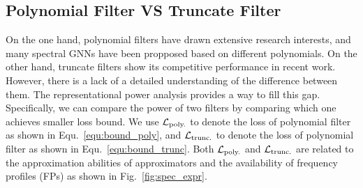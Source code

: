 \documentclass{article} %
\begin{document}
\subsection{Polynomial Filter VS Truncate Filter}
\label{sec:vs}
On the one hand, polynomial filters have drawn extensive research interests, and many spectral GNNs have been propposed based on different polynomials.
On the other hand, truncate filters show its competitive performance in recent work.
However, there is a lack of a detailed understanding of the difference between them.
The representational power analysis provides a way to fill this gap.
Specifically, we can compare the power of two filters by comparing which one achieves smaller loss bound.
We use ${\mathcal{L}}_{\textrm{poly.}}$ to denote the loss of polynomial filter as shown in Equ.~\ref{equ:bound_poly}, and ${\mathcal{L}}_{\textrm{trunc.}}$ to denote the loss of polynomial filter as shown in Equ.~\ref{equ:bound_trunc}.
Both ${\mathcal{L}}_{\textrm{poly.}}$ and ${\mathcal{L}}_{\textrm{trunc.}}$ are related to the approximation abilities of approximators and the availability of frequency profiles (FPs) as shown in Fig.~\ref{fig:spec_expr}.
\end{document}
